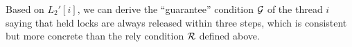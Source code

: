 Based on $L_2'[i]$, we can  derive the ``guarantee'' condition $\mathcal{G}$ of the thread $i$ saying that held locks are always released within three steps, which is consistent but more concrete than the rely condition $\mathcal{R}$ defined above.


%
%
%
%
%
%
%
%
%
%
%
%
%
